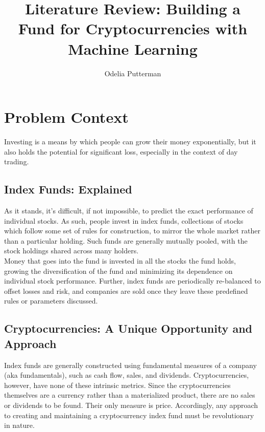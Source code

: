 \documentclass{article}
\title{Literature Review: Building a Fund for Cryptocurrencies with Machine Learning}
\author{Odelia Putterman}
\begin{document}
\maketitle

\section{Problem Context}
\label{sec:context}

Investing is a means by which people can grow their money exponentially, but it also holds the potential for significant loss, especially in the context of day trading.

\subsection{Index Funds: Explained}
\label{sec:indexfunds}

As it stands, it's difficult, if not impossible, to predict the exact performance of individual stocks. As such, people invest in index funds, collections of stocks which follow some set of rules for construction, to mirror the whole market rather than a particular holding. Such funds are generally mutually pooled, with the stock holdings shared across many holders. \\

Money that goes into the fund is invested in all the stocks the fund holds, growing the diversification of the fund and minimizing its dependence on individual stock performance. Further, index funds are periodically re-balanced to offset losses and risk, and companies are sold once they leave these predefined rules or parameters discussed.

\subsection{Cryptocurrencies: A Unique Opportunity and Approach}
\label{sec:cryptocurrencies}

Index funds are generally constructed using fundamental measures of a company (aka fundamentals), such as cash flow, sales, and dividends. Cryptocurrencies, however, have none of these intrinsic metrics. Since the cryptocurrencies themselves are a currency rather than a materialized product, there are no sales or dividends to be found. Their only measure is price. Accordingly, any approach to creating and maintaining a cryptocurrency index fund must be revolutionary in nature. \\
\end{document}
